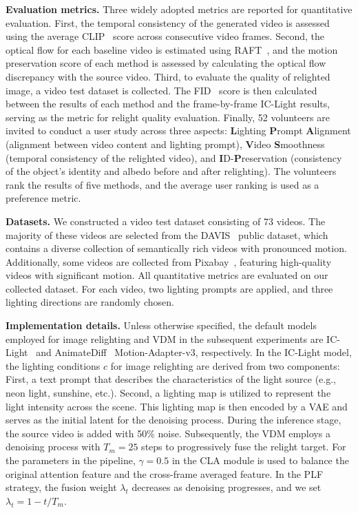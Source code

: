 \noindent \textbf{Evaluation metrics.} Three widely adopted metrics are reported for quantitative evaluation.
First, the temporal consistency of the generated video is assessed using the
average CLIP~\citep{radford2021learning} score across consecutive video frames. 
Second, the optical flow for each baseline video is estimated using RAFT~\citep{teed2020raft},
and the motion preservation score of each method is assessed by calculating the optical flow discrepancy with the source video.
Third, to evaluate the quality of relighted image, a video test dataset is collected.
The FID~\cite{Seitzer2020FID} score is then calculated between the results of each method
and the frame-by-frame IC-Light results, serving as the metric for relight quality evaluation.
Finally, 52 volunteers are invited to conduct a user study across three aspects: 
\textbf{L}ighting \textbf{P}rompt \textbf{A}lignment (alignment between video content and lighting prompt), 
\textbf{V}ideo \textbf{S}moothness (temporal consistency of the relighted video), and \textbf{I}D-\textbf{P}reservation 
(consistency of the object’s identity and albedo
before and after relighting). 
The volunteers rank the results of five methods,
and the average user ranking is used as a preference metric.

\noindent \textbf{Datasets.} 
We constructed a video test dataset consisting of 73 videos.
The majority of these videos are selected from the DAVIS~\citep{pont20172017} public dataset, 
which contains a diverse collection of semantically rich videos with pronounced motion.
Additionally, some videos are collected from Pixabay~\cite{pixabay}, 
featuring high-quality videos with significant motion.
All quantitative metrics are evaluated on our collected dataset.
For each video, two lighting prompts are applied, and three lighting directions are randomly chosen. 

\noindent \textbf{Implementation details.} Unless otherwise specified,
the default models employed for image relighting and 
VDM in the subsequent experiments are IC-Light~\citep{zhang2025scaling} 
and AnimateDiff~\citep{guo2023animatediff} Motion-Adapter-v3, respectively.
In the IC-Light model, the lighting conditions $c$ for image relighting are derived from two components:
First, a text prompt that describes the characteristics of the light source (e.g., neon light, sunshine, etc.).
Second, a lighting map is utilized to represent the light intensity across the scene.
This lighting map is then encoded by a VAE and serves as the initial latent for the denoising process.
During the inference stage, the source video is added with 50\% noise. 
Subsequently, the VDM employs a denoising process with $T_m = 25$ steps to 
progressively fuse the relight target.
For the parameters in the pipeline,
$\gamma=0.5$ in the CLA module is used to balance the original attention feature
and the cross-frame averaged feature.
In the PLF strategy, the fusion weight $\lambda_t$ decreases as denoising progresses,
and we set $\lambda_t = 1 - t/T_m$. 
\vspace{-0.5em}
